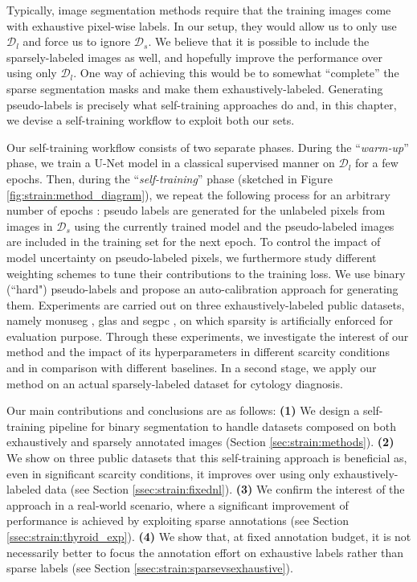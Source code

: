 Typically, image segmentation methods require that the training images come with exhaustive pixel-wise labels. In our setup, they would allow us to only use $\mathcal{D}_l$ and force us to ignore $\mathcal{D}_s$. We believe that it is possible to include the sparsely-labeled images as well, and hopefully improve the performance over using only $\mathcal{D}_l$.
One way of achieving this would be to somewhat ``complete'' the sparse segmentation masks and make them exhaustively-labeled. Generating pseudo-labels is precisely what self-training approaches do and, in this chapter, we devise a self-training workflow to exploit both our sets.

Our self-training workflow consists of two separate phases. During the ``\textit{warm-up}'' phase, we train a U-Net \cite{ronneberger2015unet} model in a classical supervised manner on $\mathcal{D}_l$ for a few epochs. Then, during the ``\textit{self-training}'' phase (sketched in Figure \ref{fig:strain:method_diagram}), we repeat the following process for an arbitrary number of epochs : pseudo labels are generated for the unlabeled pixels from images in $\mathcal{D}_s$ using the currently trained model and the pseudo-labeled images are included in the training set for the next epoch. To control the impact of model uncertainty on pseudo-labeled pixels, we furthermore study different weighting schemes to tune their contributions to the training loss. We use binary (``hard") pseudo-labels and propose an auto-calibration approach for generating them. Experiments are carried out on three exhaustively-labeled public datasets, namely \acrshort{monuseg} \cite{kumar2019multi}, \acrshort{glas} \cite{sirinukunwattana2017gland} and \acrshort{segpc} \cite{gupta2021segpc}, on which sparsity is artificially enforced for evaluation purpose. Through these experiments, we investigate the interest of our method and the impact of its hyperparameters in different scarcity conditions and in comparison with different baselines. In a second stage, we apply our method on an actual sparsely-labeled dataset for cytology diagnosis.

Our main contributions and conclusions are as follows: \textbf{(1)} We design a self-training pipeline for binary segmentation to handle datasets composed on both exhaustively and sparsely annotated images (Section \ref{sec:strain:methods}). \textbf{(2)} We show on three public datasets that this self-training approach is beneficial as, even in significant scarcity conditions, it improves over using only exhaustively-labeled data (see Section \ref{ssec:strain:fixednl}). \textbf{(3)} We confirm the interest of the approach in a real-world scenario, where a significant improvement of performance is achieved by exploiting sparse annotations (see Section \ref{ssec:strain:thyroid_exp}). \textbf{(4)} We show that, at fixed annotation budget, it is not necessarily better to focus the annotation effort on exhaustive labels rather than sparse labels (see Section \ref{ssec:strain:sparsevsexhaustive}).

